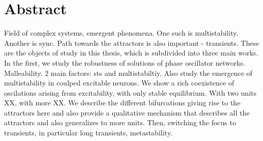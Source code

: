 \section*{Abstract}

Field of complex systems, emergent phenomena. One such is multistability. Another is sync. Path towards the attractors is also important - transients. These are the objects of study in this thesis, which is subdivided into three main works. In the first, we study the robustness of solutions of phase oscillator networks. Malleability. 2 main factors: sts and multistabiltiy. Also study the emergence of multistability in coulped excitable neurons. We show a rich coexistence of oscilations arising from excitability, with only stable equilibrium. With two units XX, with more XX. We describe the different bifurcations giving rise to the attractors here and also provide a qualitative mechanism that describes all the attractors and also generalizes to more units. Then, switching the focus to transients, in particular long transients, metastability.
